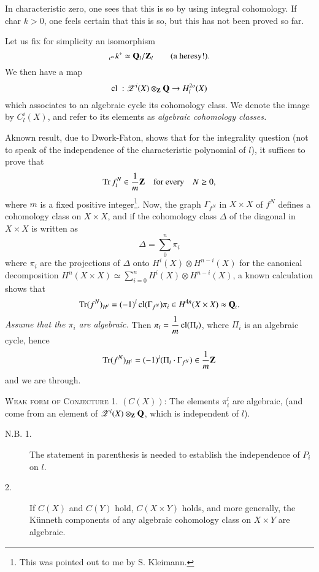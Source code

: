 In characteristic zero, one sees that this is so by using integral cohomology. If char $k>0$, one feels certain that this is so, but this has not been proved so far.

Let us fix for simplicity an isomorphism
\begin{equation*}
{}_{\iota^{\infty}}k^{*}\simeq \bfQ_{l}/\bfZ_{l}\tag*{(\text{a heresy!}).}
\end{equation*}
We then have a map
$$
\text{cl } : \mathscr{Z}^{i}(X)\otimes_{\mathbf{Z}}\mathbf{Q}\to H^{2o}_{l}(X) 
$$
which associates to an algebraic cycle its cohomology class. We denote the image by $C^{i}_{l}(X)$, and refer to its elements as {\em algebraic cohomology classes.}

A\pageoriginale known result, due to Dwork-Faton, shows that for the integrality question (not to speak of the independence of the characteristic polynomial of $l$), it suffices to prove that
$$
\operatorname{\mathrm{Tr}} f^{N}_{i}\in \dfrac{1}{m}\mathbf{Z}\quad\text{for every}\quad N\geq 0,
$$
where $m$ is a fixed positive integer\footnote{This was pointed out to me by S. Kleimann.}. Now, the graph $\Gamma_{f^{N}}$ in $X\times X$ of $f^{N}$ defines a cohomology class on $X\times X$, and if the cohomology class $\Delta$ of the diagonal in $X\times X$ is written as
$$
\Delta=\sum\limits^{n}_{0}\pi_{i}
$$
where $\pi_{i}$ are the projections of $\Delta$ onto $H^{i}(X)\otimes H^{n-i}(X)$ for the canonical decomposition $H^{n}(X\times X)\simeq \sum\limits^{n}_{i=0}H^{i}(X)\otimes H^{n-i}(X)$, a known calculation shows that
$$
\operatorname{\mathrm{Tr}}(f^{N})_{H^{i}}=(-1)^{i}\operatorname{\mathrm{cl}}(\Gamma_{f^{N}})\pi_{i}\in H^{4n}(X\times X)\approx \mathbf{Q}_{\iota}.
$$
{\em Assume that the $\pi_{i}$ are algebraic.} Then $\pi_{i}=\dfrac{1}{m}\operatorname{\mathrm{cl}}(\Pi_{i})$, where $\Pi_{i}$ is an algebraic cycle, hence
$$
\operatorname{\mathrm{Tr}}(f^{N})_{H^{i}}=(-1)^{i}(\Pi_{i}\cdot \Gamma_{f^{N}})\in \dfrac{1}{m}\mathbf{Z}
$$
and we are through.

\textsc{Weak form of Conjecture 1.} $(C(X))$: The elements $\pi^{l}_{i}$ are algebraic, (and come from an element of $\mathscr{Z}^{i}(X)\otimes_{\mathbf{Z}}\mathbf{Q}$, which is independent of $l$).
\begin{description}
\item[N.B. 1.] The statement in parenthesis is needed to establish the independence of $P_{i}$ on $l$.
 
\item[2.] If $C(X)$ and $C(Y)$ hold, $C(X\times Y)$ holds, and more generally, the K\"unneth components of any algebraic cohomology class on $X\times Y$ are algebraic.
\end{description}


